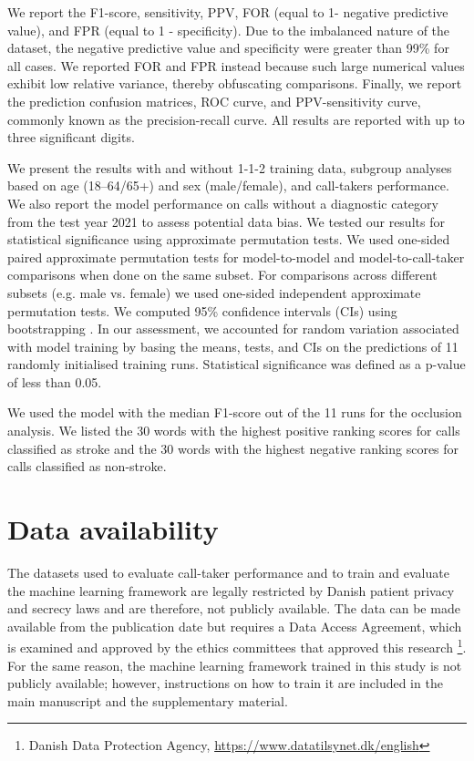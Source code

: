 {We report the F1-score, sensitivity, PPV, FOR (equal to 1- negative predictive value), and FPR (equal to 1 - specificity). Due to the imbalanced nature of the dataset, the negative predictive value and specificity were greater than 99\% for all cases. We reported FOR and FPR instead because such large numerical values exhibit low relative variance, thereby obfuscating comparisons. Finally, we report the prediction confusion matrices, ROC curve, and PPV-sensitivity curve, commonly known as the precision-recall curve. All results are reported with up to three significant digits.

We present the results with and without 1-1-2 training data, subgroup analyses based on age (18–64/65+) and sex (male/female), and call-takers performance. We also report the model performance on calls without a diagnostic category from the test year 2021 to assess potential data bias. We tested our results for statistical significance using approximate permutation tests. We used one-sided paired approximate permutation tests for model-to-model and model-to-call-taker comparisons when done on the same subset. For comparisons across different subsets (e.g. male vs. female) we used one-sided independent approximate permutation tests. We computed 95\% confidence intervals (CIs) using bootstrapping \parencite{dwass_modified_1957,eden_validity_1933}. In our assessment, we accounted for random variation associated with model training by basing the means, tests, and CIs on the predictions of 11 randomly initialised training runs. Statistical significance was defined as a p-value of less than 0.05.

We used the model with the median F1-score out of the 11 runs for the occlusion analysis. We listed the 30 words with the highest positive ranking scores for calls classified as stroke and the 30 words with the highest negative ranking scores for calls classified as non-stroke.


\section*{Data availability}

The datasets used to evaluate call-taker performance and to train and evaluate the machine learning framework are legally restricted by Danish patient privacy and secrecy laws and are therefore, not publicly available. The data can be made available from the publication date but requires a Data Access Agreement, which is examined and approved by the ethics committees that approved this research \footnote{Danish Data Protection Agency, \url{https://www.datatilsynet.dk/english}}. For the same reason, the machine learning framework trained in this study is not publicly available; however, instructions on how to train it are included in the main manuscript and the supplementary material. 


}
